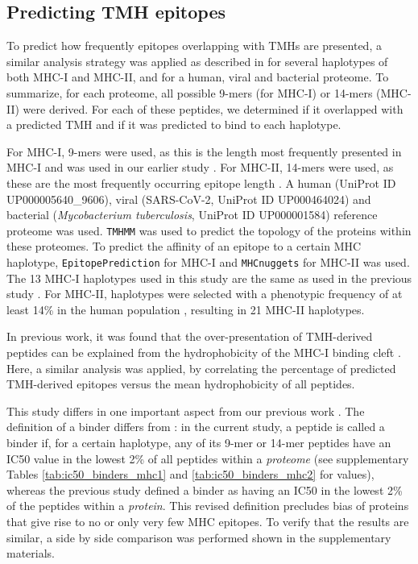 \subsection{Predicting TMH epitopes}

To predict how frequently epitopes overlapping with TMHs are presented,
a similar analysis strategy was applied as described in \cite{bianchi2017} 
for several haplotypes of both MHC-I and MHC-II, 
and for a human, viral and bacterial proteome.
To summarize, for each proteome, 
all possible 9-mers (for MHC-I) or 14-mers (MHC-II) were derived. 
For each of these peptides, we determined if it overlapped with a predicted 
TMH and if it was predicted to bind to each haplotype.

For MHC-I, 9-mers were used, 
as this is the length most frequently presented in MHC-I 
and was used in our earlier study \cite{bianchi2017}. 
For MHC-II, 14-mers were used, 
as these are the most frequently occurring epitope length \cite{bergseng2015different}.
A human (UniProt ID UP000005640\_9606), 
viral (SARS-CoV-2, UniProt ID UP000464024) 
and bacterial (\emph{Mycobacterium tuberculosis}, UniProt ID UP000001584) 
reference proteome was used. 
\verb;TMHMM; \cite{krogh2001predicting} was used to predict the topology 
of the proteins within these proteomes.
To predict the affinity of an epitope to a certain MHC haplotype,
 \verb;EpitopePrediction; \cite{bianchi2017} for MHC-I 
and \verb;MHCnuggets; \cite{shao2020high} for MHC-II was used.
The 13 MHC-I haplotypes used in this study are the same as 
used in the previous study \cite{bianchi2017}.
For MHC-II, haplotypes were selected with a phenotypic frequency 
of at least 14\% in the human population \cite{greenbaum2011functional},
resulting in 21 MHC-II haplotypes.
 
In previous work, it was found that the over-presentation of TMH-derived peptides can be
explained from the hydrophobicity of the MHC-I binding cleft \cite{bianchi2017}.
Here, a similar analysis was applied, by correlating the percentage of predicted TMH-derived epitopes versus the mean hydrophobicity of all 
peptides. 

This study differs in one important aspect from our previous work \cite{bianchi2017}. 
The definition of a binder differs from \cite{bianchi2017}:
in the current study, a peptide is called a binder if, for a certain haplotype, 
any of its 9-mer or 14-mer peptides have an IC50 value in the lowest 2\% of 
all peptides within a \emph{proteome} 
(see supplementary Tables \ref{tab:ic50_binders_mhc1} and \ref{tab:ic50_binders_mhc2} for values), 
whereas the previous study defined
a binder as having an IC50 in the lowest 2\% 
of the peptides within a \emph{protein}.
This revised definition precludes bias of proteins 
that give rise to no or only very few MHC epitopes.
To verify that the results are similar, a side by side comparison was performed shown in the supplementary materials.

